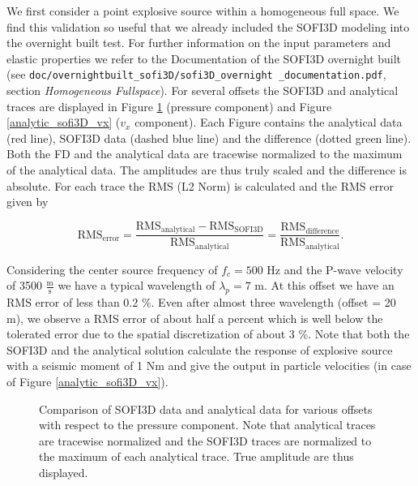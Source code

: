\documentclass[11pt,onecolumn,oneside]{article}
\begin{document}
We first consider a point explosive source within a homogeneous full space. We find this validation so useful that we already included the SOFI3D modeling into the overnight built test. For further information on the input parameters and elastic properties we refer to the Documentation of the SOFI3D overnight built 
(see \lstinline{doc/overnightbuilt_sofi3D/sofi3D_overnight _documentation.pdf}, section \textit{Homogeneous Fullspace}). For several offsets the SOFI3D and analytical traces are displayed in Figure \ref{analytic_sofi3D_p} (pressure component) and Figure \ref{analytic_sofi3D_vx} ($v_x$ component). Each Figure contains the analytical data (red line), SOFI3D data (dashed blue line) and the difference (dotted green line). Both the FD and the analytical data are tracewise normalized to the maximum of the analytical data. The amplitudes are thus truly scaled and the difference is absolute. For each trace the RMS (L2 Norm) is calculated and the RMS error given by

\begin{equation}
\mbox{RMS}_{\mbox{error}} = \frac{\mbox{RMS}_{\mbox{analytical}} -\mbox{RMS}_{\mbox{SOFI3D}} }{\mbox{RMS}_{\mbox{analytical}}} = \frac{\mbox{RMS}_{\mbox{difference}} }{\mbox{RMS}_{\mbox{analytical}}}\mbox{.}
\end{equation}

Considering the center source frequency of $f_c = 500 $ Hz and the P-wave velocity of 3500 $\frac{\mbox{m}}{\mbox{s}}$ we have a typical wavelength of $\lambda_p = 7$ m. At this offset we have an RMS error of less than 0.2 \%. Even after almost three wavelength (offset = 20 m), we observe a RMS error of about half a percent which is well below the tolerated error due to the spatial discretization of about 3 \%. Note that both the SOFI3D and the analytical solution calculate the response of explosive source with a seismic moment of 1 Nm and give the output in particle velocities (in case of Figure \ref{analytic_sofi3D_vx}).


\begin{figure}[ht]
\begin{center}
\caption{\label{analytic_sofi3D_p} Comparison of SOFI3D data and analytical data for various offsets with respect to the pressure component. Note that analytical traces are tracewise normalized and the SOFI3D traces are normalized to the maximum of each analytical trace. True amplitude are thus displayed.}
\end{center}
\end{figure} 
\end{document}
